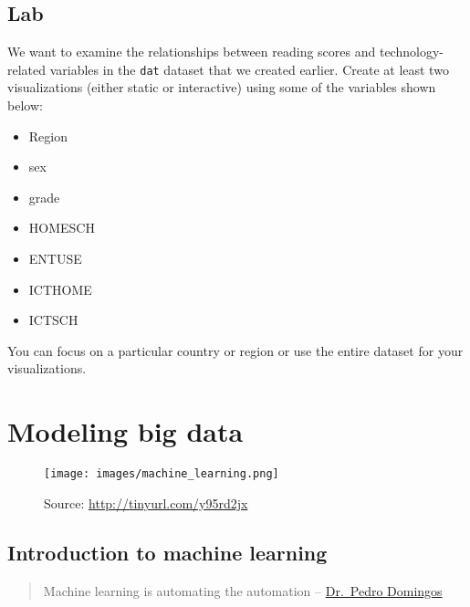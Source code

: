 \documentclass[
]{book}
\providecommand{\tightlist}{%
  \setlength{\itemsep}{0pt}\setlength{\parskip}{0pt}}
\begin{document}
\hypertarget{lab-1}{%
\section{Lab}\label{lab-1}}

We want to examine the relationships between reading scores and technology-related variables in the \texttt{dat} dataset that we created earlier. Create at least two visualizations (either static or interactive) using some of the variables shown below:

\begin{itemize}
\tightlist
\item
  Region
\item
  sex
\item
  grade
\item
  HOMESCH
\item
  ENTUSE
\item
  ICTHOME
\item
  ICTSCH
\end{itemize}

You can focus on a particular country or region or use the entire dataset for your visualizations.

\hypertarget{modeling-big-data}{%
\chapter{Modeling big data}\label{modeling-big-data}}

\begin{figure}
\centering
\texttt{[image: images/machine\_learning.png]}
\caption{Source: \url{http://tinyurl.com/y95rd2jx}}
\end{figure}

\hypertarget{introduction-to-machine-learning}{%
\section{Introduction to machine learning}\label{introduction-to-machine-learning}}

\begin{quote}
Machine learning is automating the automation -- \href{https://homes.cs.washington.edu/~pedrod/}{Dr.~Pedro Domingos}
\end{quote}
\end{document}
